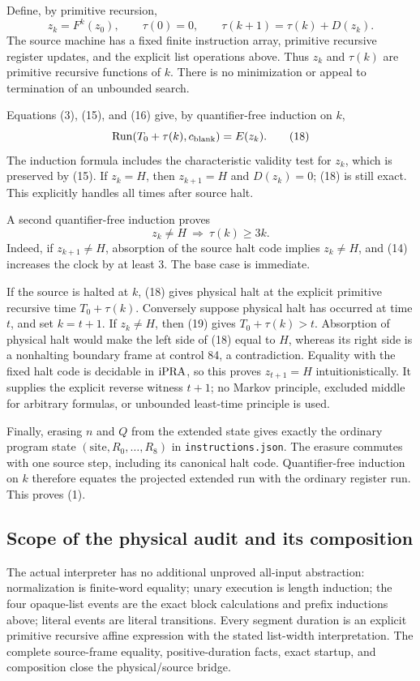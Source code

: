 Define, by primitive recursion,
\[
 z_k=F^k(z_0),\qquad
 \tau(0)=0,\qquad \tau(k+1)=\tau(k)+D(z_k).                      \tag{17}
\]
The source machine has a fixed finite instruction array, primitive
recursive register updates, and the explicit list operations above.
Thus $z_k$ and $\tau(k)$ are primitive recursive functions of $k$.
There is no minimization or appeal to termination of an unbounded search.

Equations (3), (15), and (16) give, by quantifier-free induction on $k$,
\[
 \operatorname{Run}(T_0+\tau(k),c_{\rm blank})=E(z_k).                         \tag{18}
\]
The induction formula includes the characteristic validity test for
$z_k$, which is preserved by (15).  If $z_k=H$, then $z_{k+1}=H$ and
$D(z_k)=0$; (18) is still exact.  This explicitly handles all times
after source halt.

A second quantifier-free induction proves
\[
 z_k\neq H\ \Longrightarrow\ \tau(k)\geq3k.                    \tag{19}
\]
Indeed, if $z_{k+1}\neq H$, absorption of the source halt code implies
$z_k\neq H$, and (14) increases the clock by at least 3.  The base case
is immediate.

If the source is halted at $k$, (18) gives physical halt at the explicit
primitive recursive time $T_0+\tau(k)$.  Conversely suppose physical
halt has occurred at time $t$, and set $k=t+1$.  If $z_k\neq H$, then
(19) gives $T_0+\tau(k)>t$.  Absorption of physical halt would make the
left side of (18) equal to $H$, whereas its right side is a nonhalting
boundary frame at control 84, a contradiction.  Equality with the fixed
halt code is decidable in $\mathrm{iPRA}$, so this proves $z_{t+1}=H$
intuitionistically.  It supplies the explicit reverse witness $t+1$;
no Markov principle, excluded middle for arbitrary formulas, or
unbounded least-time principle is used.

Finally, erasing $n$ and $Q$ from the extended state gives exactly the
ordinary program state $(\text{site},R_0,\ldots,R_8)$ in
\texttt{instructions.json}.  The erasure commutes with one source step,
including its canonical halt code.  Quantifier-free induction on $k$
therefore equates the projected extended run with the ordinary register
run.  This proves (1).

\subsection{Scope of the physical audit and its composition}

The actual interpreter has no additional unproved all-input abstraction:
normalization is finite-word equality; unary execution is length
induction; the four opaque-list events are the exact block calculations
and prefix inductions above; literal events are literal transitions.
Every segment duration is an explicit primitive recursive affine
expression with the stated list-width interpretation.  The complete
source-frame equality, positive-duration facts, exact startup, and
composition close the physical/source bridge.


